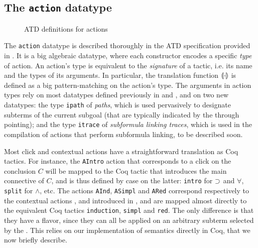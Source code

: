 \subsection{The \texttt{action} datatype}

\begin{figure}
  
  \caption{ATD definitions for actions}
\end{figure}

The \texttt{action} datatype is described thoroughly in the ATD specification
provided in . It is a big algebraic datatype, where each
constructor encodes a specific \emph{type} of action. An action's type is
equivalent to the \emph{signature} of a tactic, i.e. its name and the types of
its arguments. In particular, the translation function $\llparenthesis \cdot \rrparenthesis$ is
defined as a big pattern-matching on the action's type. The arguments in action types rely
on most datatypes defined previously in  and ,
and on two new datatypes: the type \texttt{ipath} of \emph{paths}, which is used
pervasively to designate subterms of the current subgoal (that are typically
indicated by the  through pointing); and the type \texttt{itrace}
of \emph{subformula linking traces}, which is used in the compilation of 
actions that perform subformula linking, to be described soon.

Most click and contextual actions have a straightforward translation as Coq
tactics. For instance, the \texttt{AIntro} action that corresponds to a click on
the conclusion $C$ will be mapped to the Coq tactic that introduces the main
connective of $C$, and is thus defined by case on the latter: \texttt{intro} for
$\supset$ and $\forall$, \texttt{split} for $\land$, etc. The actions
\texttt{AInd}, \texttt{ASimpl} and \texttt{ARed} correspond respectively to the
contextual actions ,  and 
introduced in , and are mapped almost directly to the equivalent
Coq tactics \texttt{induction}, \texttt{simpl} and \texttt{red}. The only
difference is that they have a \emph{} flavor, since they can all
be applied on an arbitrary subterm selected by the . This relies
on our implementation of  semantics directly in Coq, that we now
briefly describe.

